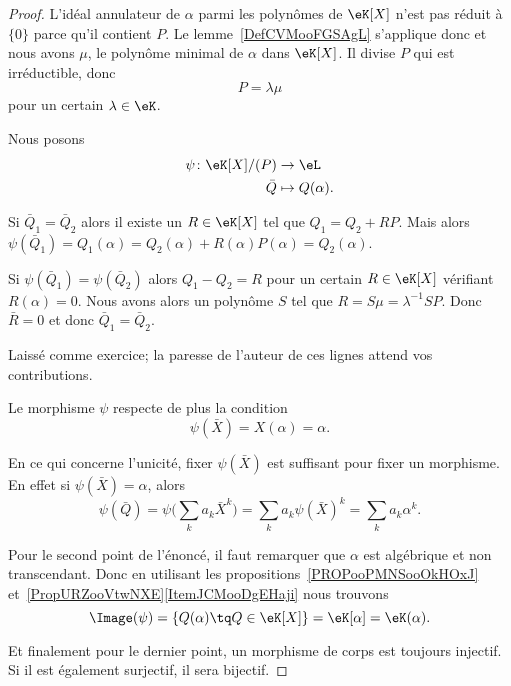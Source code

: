 \begin{proof}
	L'idéal annulateur de \( \alpha\) parmi les polynômes de \( \eK[X]\) n'est pas réduit à \( \{ 0 \}\) parce qu'il contient \( P\). Le lemme~\ref{DefCVMooFGSAgL} s'applique donc et nous avons \( \mu\), le polynôme minimal de \( \alpha\) dans \( \eK[X]\). Il divise \( P\) qui est irréductible, donc
	\begin{equation}
		P=\lambda \mu
	\end{equation}
	pour un certain \( \lambda\in \eK\).

	Nous posons
	\begin{equation}
		\begin{aligned}
			\psi\colon \eK[X]/(P) & \to \eL            \\
			\bar Q                & \mapsto Q(\alpha).
		\end{aligned}
	\end{equation}
	\begin{subproof}
		Si \( \bar Q_1=\bar Q_2\) alors il existe un \( R\in \eK[X]\) tel que \( Q_1=Q_2+RP\). Mais alors \( \psi(\bar Q_1)=Q_1(\alpha)=Q_2(\alpha)+R(\alpha)P(\alpha)=Q_2(\alpha)\).
		\spitem[Injective]

		Si \( \psi(\bar Q_1)=\psi(\bar Q_2)\) alors \( Q_1-Q_2=R\) pour un certain \( R\in \eK[X]\) vérifiant \( R(\alpha)=0\). Nous avons alors un polynôme \( S\) tel que \( R=S\mu=\lambda^{-1}SP\). Donc \( \bar R=0\) et donc \( \bar Q_1=\bar Q_2\).

		\spitem[Morphisme]

		Laissé comme exercice; la paresse de l'auteur de ces lignes attend vos contributions.

		\spitem[La condition]

		Le morphisme \( \psi\) respecte de plus la condition
		\begin{equation}
			\psi(\bar X)=X(\alpha)=\alpha.
		\end{equation}

	\end{subproof}

	En ce qui concerne l'unicité, fixer \( \psi(\bar X)\) est suffisant pour fixer un morphisme. En effet si \( \psi(\bar X)=\alpha\), alors
	\begin{equation}
		\psi(\bar Q)=\psi\Big( \sum_ka_k\bar X^k \Big)=\sum_ka_k\psi(\bar X)^k=\sum_ka_k\alpha^k.
	\end{equation}

	Pour le second point de l'énoncé, il faut remarquer que \( \alpha\) est algébrique et non transcendant. Donc en utilisant les propositions~\ref{PROPooPMNSooOkHOxJ} et~\ref{PropURZooVtwNXE}\ref{ItemJCMooDgEHaji} nous trouvons
	\begin{equation}
		\Image(\psi)=\{ Q(\alpha)\tq Q\in \eK[X] \}=\eK[\alpha]=\eK(\alpha).
	\end{equation}

	Et finalement pour le dernier point, un morphisme de corps est toujours injectif. Si il est également surjectif, il sera bijectif.
\end{proof}

